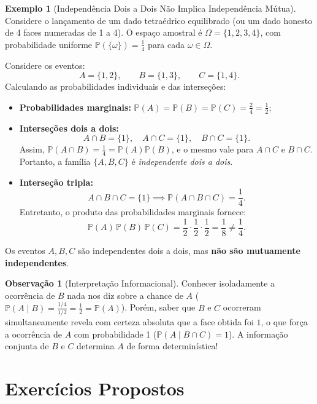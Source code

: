 \documentclass[12pt,portuguese]{article}
\theoremstyle{definition}
\newtheorem{example}[example]{Exemplo}
\newtheorem{remark}[remark]{Observação}
\begin{document}
\begin{example}[Independência Dois a Dois Não Implica Independência Mútua]\label{ex:dado-quatro-faces}
Considere o lançamento de um dado tetraédrico equilibrado (ou um dado honesto de 4 faces numeradas de 1 a 4). O espaço amostral é \(\Omega = \{1, 2, 3, 4\}\), com probabilidade uniforme \(\mathbb{P}(\{\omega\}) = \tfrac{1}{4}\) para cada \(\omega \in \Omega\).

Considere os eventos:
\[
  A = \{1, 2\}, \qquad B = \{1, 3\}, \qquad C = \{1, 4\}.
\]
Calculando as probabilidades individuais e das interseções:
\begin{itemize}
  \item \textbf{Probabilidades marginais:} \(\mathbb{P}(A) = \mathbb{P}(B) = \mathbb{P}(C) = \tfrac{2}{4} = \tfrac{1}{2}\);
  \item \textbf{Interseções dois a dois:}
  \[
    A \cap B = \{1\}, \quad A \cap C = \{1\}, \quad B \cap C = \{1\}.
  \]
  Assim, \(\mathbb{P}(A \cap B) = \tfrac{1}{4} = \mathbb{P}(A)\mathbb{P}(B)\), e o mesmo vale para \(A \cap C\) e \(B \cap C\). Portanto, a família \(\{A, B, C\}\) é \emph{independente dois a dois}.
  \item \textbf{Interseção tripla:}
  \[
    A \cap B \cap C = \{1\} \implies \mathbb{P}(A \cap B \cap C) = \frac{1}{4}.
  \]
  Entretanto, o produto das probabilidades marginais fornece:
  \[
    \mathbb{P}(A)\,\mathbb{P}(B)\,\mathbb{P}(C) = \frac{1}{2} \cdot \frac{1}{2} \cdot \frac{1}{2} = \frac{1}{8} \ne \frac{1}{4}.
  \]
\end{itemize}
Os eventos \(A, B, C\) são independentes dois a dois, mas \textbf{não são mutuamente independentes}.

\begin{remark}[Interpretação Informacional]
Conhecer isoladamente a ocorrência de \(B\) nada nos diz sobre a chance de \(A\) (\(\mathbb{P}(A \mid B) = \tfrac{1/4}{1/2} = \tfrac{1}{2} = \mathbb{P}(A)\)). Porém, saber que \(B\) e \(C\) ocorreram simultaneamente revela com certeza absoluta que a face obtida foi \(1\), o que força a ocorrência de \(A\) com probabilidade 1 (\(\mathbb{P}(A \mid B \cap C) = 1\)). A informação conjunta de \(B\) e \(C\) determina \(A\) de forma determinística!
\end{remark}
\end{example}

\section{Exercícios Propostos}
\label{sec:exercicios}
\end{document}
